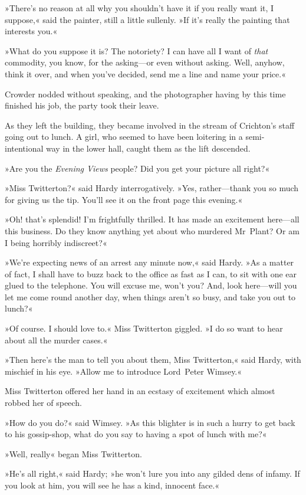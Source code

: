 »There's no reason at all why you shouldn't have it if you really want it, I suppose,« said the painter, still a little sullenly. »If it's really the painting that interests you.«

»What do you suppose it is? The notoriety? I can have all I want of \textit{that} commodity, you know, for the asking—or even without asking. Well, anyhow, think it over, and when you've decided, send me a line and name your price.«

Crowder nodded without speaking, and the photographer having by this time finished his job, the party took their leave.

As they left the building, they became involved in the stream of Crichton's staff going out to lunch. A girl, who seemed to have been loitering in a semi-intentional way in the lower hall, caught them as the lift descended.

»Are you the \textit{Evening Views} people? Did you get your picture all right?«

»Miss Twitterton?« said Hardy interrogatively. »Yes, rather—thank you so much for giving us the tip. You'll see it on the front page this evening.«

»Oh! that's splendid! I'm frightfully thrilled. It has made an excitement here—all this business. Do they know anything yet about who murdered Mr~Plant? Or am I being horribly indiscreet?«

»We're expecting news of an arrest any minute now,« said Hardy. »As a matter of fact, I shall have to buzz back to the office as fast as I can, to sit with one ear glued to the telephone. You will excuse me, won't you? And, look here—will you let me come round another day, when things aren't so busy, and take you out to lunch?«

»Of course. I should love to.« Miss Twitterton giggled. »I do so want to hear about all the murder cases.«

»Then here's the man to tell you about them, Miss Twitterton,« said Hardy, with mischief in his eye. »Allow me to introduce Lord~Peter Wimsey.«

Miss Twitterton offered her hand in an ecstasy of excitement which almost robbed her of speech.

»How do you do?« said Wimsey. »As this blighter is in such a hurry to get back to his gossip-shop, what do you say to having a spot of lunch with me?«

»Well, really\longdash« began Miss Twitterton.

»He's all right,« said Hardy; »he won't lure you into any gilded dens of infamy. If you look at him, you will see he has a kind, innocent face.«

